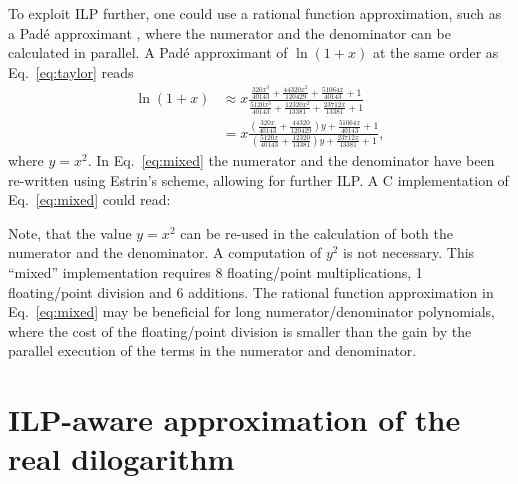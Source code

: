 \documentclass[10pt,DIV16,twocolumn,numbers=noenddot]{scrartcl}
\begin{document}
To exploit ILP further, one could use a rational function
approximation, such as a Padé approximant \cite{pade}, where the
numerator and the denominator can be calculated in parallel.  A Padé
approximant of $\ln(1+x)$ at the same order as Eq.~\eqref{eq:taylor}
reads
%
\begin{align}
  \ln(1+x) &\approx x
  \frac{\frac{320 x^3}{40143}+\frac{44320 x^2}{120429}+\frac{51064
    x}{40143}+1}{\frac{5120 x^3}{40143}+\frac{12320 x^2}{13381}+\frac{23712
    x}{13381}+1}
  \label{eq:pade}
  \\
  &= x
  \frac{\left(\frac{320 x}{40143}+\frac{44320}{120429}\right)y+\frac{51064
    x}{40143}+1}{\left(\frac{5120 x}{40143}+\frac{12320}{13381}\right)y+\frac{23712
    x}{13381}+1},
  \label{eq:mixed}
\end{align}
%
where $y=x^2$.  In Eq.~\eqref{eq:mixed} the numerator and the
denominator have been re-written using Estrin's scheme, allowing for
further ILP.  A C implementation of Eq.~\eqref{eq:mixed} could read:
%

%
Note, that the value $y=x^2$ can be re-used in the calculation of both
the numerator and the denominator.  A computation of $y^2$ is not
necessary.  This ``mixed'' implementation requires 8 floating\-/point
multiplications, 1 floating\-/point division and 6 additions.  The
rational function approximation in Eq.~\eqref{eq:mixed} may be
beneficial for long numerator/denominator polynomials, where the cost
of the floating\-/point division is smaller than the gain by the
parallel execution of the terms in the numerator and denominator.


\section{ILP-aware approximation of the real dilogarithm}
\label{sec:algorithm}
\end{document}
